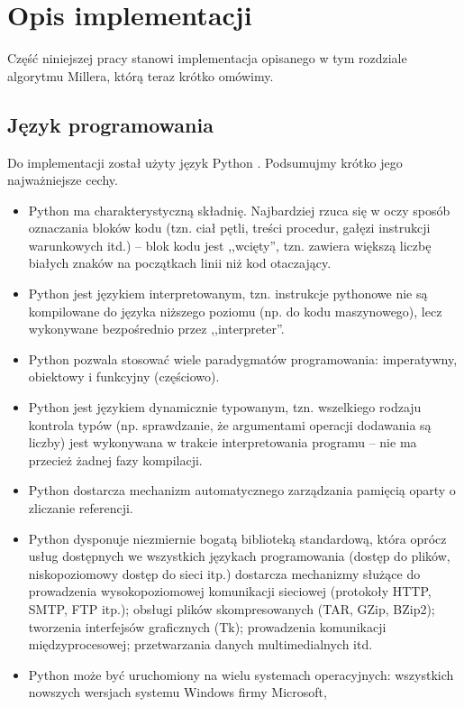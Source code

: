 \section{Opis implementacji}

\noindent
Część niniejszej pracy stanowi implementacja
opisanego w tym rozdziale algorytmu Millera,
którą teraz krótko omówimy.

\subsection*{Język programowania}

\noindent
Do implementacji został użyty język Python \cite{python}.
Podsumujmy krótko jego najważniejsze cechy.
\begin{itemize}
\item
Python ma charakterystyczną składnię.
Najbardziej rzuca się w oczy sposób oznaczania bloków kodu
(tzn. ciał pętli, treści procedur, gałęzi instrukcji warunkowych itd.) --
blok kodu jest ,,wcięty'',
tzn. zawiera większą liczbę białych znaków na początkach linii
niż kod otaczający.
\item
Python jest językiem interpretowanym,
tzn. instrukcje pythonowe nie są kompilowane do języka niższego poziomu
(np. do kodu maszynowego),
lecz wykonywane bezpośrednio przez ,,interpreter''.
\item
Python pozwala stosować wiele paradygmatów programowania:
imperatywny, obiektowy i funkcyjny (częściowo).
\item
Python jest językiem dynamicznie typowanym,
tzn. wszelkiego rodzaju kontrola typów
(np. sprawdzanie, że argumentami operacji dodawania są liczby)
jest wykonywana w trakcie interpretowania programu --
nie ma przecież żadnej fazy kompilacji.
\item
Python dostarcza mechanizm automatycznego zarządzania pamięcią
oparty o zliczanie referencji.
\item
Python dysponuje niezmiernie bogatą biblioteką standardową,
która oprócz usług dostępnych we wszystkich językach programowania
(dostęp do plików, niskopoziomowy dostęp do sieci itp.)
dostarcza mechanizmy służące
do prowadzenia wysokopoziomowej komunikacji sieciowej
(protokoły HTTP, SMTP, FTP itp.);
obsługi plików skompresowanych (TAR, GZip, BZip2);
tworzenia interfejsów graficznych (Tk);
prowadzenia komunikacji międzyprocesowej;
przetwarzania danych multimedialnych itd.
\item
Python może być uruchomiony na wielu systemach operacyjnych:
wszystkich nowszych wersjach systemu Windows firmy Microsoft,

\end{itemize}
